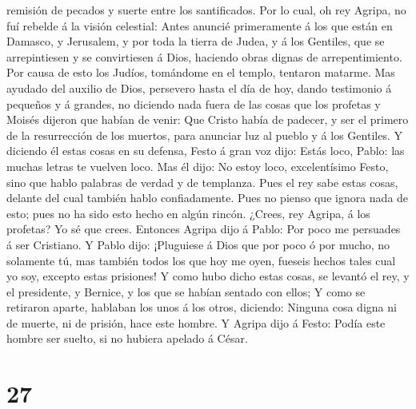 remisión de pecados y suerte entre los santificados.  Por
lo cual, oh rey Agripa, no fuí rebelde á la visión celestial:
 Antes anuncié primeramente á los que están en Damasco, y
Jerusalem, y por toda la tierra de Judea, y á los Gentiles, que se
arrepintiesen y se convirtiesen á Dios, haciendo obras dignas de
arrepentimiento.  Por causa de esto los Judíos, tomándome
en el templo, tentaron matarme.  Mas ayudado del auxilio de
Dios, persevero hasta el día de hoy, dando testimonio á pequeños y á
grandes, no diciendo nada fuera de las cosas que los profetas y Moisés
dijeron que habían de venir:  Que Cristo había de padecer,
y ser el primero de la resurrección de los muertos, para anunciar luz al
pueblo y á los Gentiles.  Y diciendo él estas cosas en su
defensa, Festo á gran voz dijo: Estás loco, Pablo: las muchas letras te
vuelven loco.  Mas él dijo: No estoy loco, excelentísimo
Festo, sino que hablo palabras de verdad y de templanza. 
Pues el rey sabe estas cosas, delante del cual también hablo
confiadamente. Pues no pienso que ignora nada de esto; pues no ha sido
esto hecho en algún rincón.  ¿Crees, rey Agripa, á los
profetas? Yo sé que crees.  Entonces Agripa dijo á Pablo:
Por poco me persuades á ser Cristiano.  Y Pablo dijo:
¡Pluguiese á Dios que por poco ó por mucho, no solamente tú, mas también
todos los que hoy me oyen, fueseis hechos tales cual yo soy, excepto
estas prisiones!  Y como hubo dicho estas cosas, se levantó
el rey, y el presidente, y Bernice, y los que se habían sentado con
ellos;  Y como se retiraron aparte, hablaban los unos á los
otros, diciendo: Ninguna cosa digna ni de muerte, ni de prisión, hace
este hombre.  Y Agripa dijo á Festo: Podía este hombre ser
suelto, si no hubiera apelado á César.

\hypertarget{section-26}{%
\section{27}\label{section-26}}

